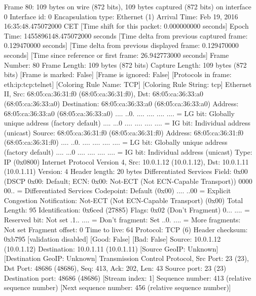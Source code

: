 Frame 80: 109 bytes on wire (872 bits), 109 bytes captured (872 bits) on interface 0
    Interface id: 0
    Encapsulation type: Ethernet (1)
    Arrival Time: Feb 19, 2016 16:35:48.475072000 CET
    [Time shift for this packet: 0.000000000 seconds]
    Epoch Time: 1455896148.475072000 seconds
    [Time delta from previous captured frame: 0.129470000 seconds]
    [Time delta from previous displayed frame: 0.129470000 seconds]
    [Time since reference or first frame: 26.942773000 seconds]
    Frame Number: 80
    Frame Length: 109 bytes (872 bits)
    Capture Length: 109 bytes (872 bits)
    [Frame is marked: False]
    [Frame is ignored: False]
    [Protocols in frame: eth:ip:tcp:telnet]
    [Coloring Rule Name: TCP]
    [Coloring Rule String: tcp]
Ethernet II, Src: 68:05:ca:36:31:f0 (68:05:ca:36:31:f0), Dst: 68:05:ca:36:33:a0 (68:05:ca:36:33:a0)
    Destination: 68:05:ca:36:33:a0 (68:05:ca:36:33:a0)
        Address: 68:05:ca:36:33:a0 (68:05:ca:36:33:a0)
        .... ..0. .... .... .... .... = LG bit: Globally unique address (factory default)
        .... ...0 .... .... .... .... = IG bit: Individual address (unicast)
    Source: 68:05:ca:36:31:f0 (68:05:ca:36:31:f0)
        Address: 68:05:ca:36:31:f0 (68:05:ca:36:31:f0)
        .... ..0. .... .... .... .... = LG bit: Globally unique address (factory default)
        .... ...0 .... .... .... .... = IG bit: Individual address (unicast)
    Type: IP (0x0800)
Internet Protocol Version 4, Src: 10.0.1.12 (10.0.1.12), Dst: 10.0.1.11 (10.0.1.11)
    Version: 4
    Header length: 20 bytes
    Differentiated Services Field: 0x00 (DSCP 0x00: Default; ECN: 0x00: Not-ECT (Not ECN-Capable Transport))
        0000 00.. = Differentiated Services Codepoint: Default (0x00)
        .... ..00 = Explicit Congestion Notification: Not-ECT (Not ECN-Capable Transport) (0x00)
    Total Length: 95
    Identification: 0x6ced (27885)
    Flags: 0x02 (Don't Fragment)
        0... .... = Reserved bit: Not set
        .1.. .... = Don't fragment: Set
        ..0. .... = More fragments: Not set
    Fragment offset: 0
    Time to live: 64
    Protocol: TCP (6)
    Header checksum: 0xb795 [validation disabled]
        [Good: False]
        [Bad: False]
    Source: 10.0.1.12 (10.0.1.12)
    Destination: 10.0.1.11 (10.0.1.11)
    [Source GeoIP: Unknown]
    [Destination GeoIP: Unknown]
Transmission Control Protocol, Src Port: 23 (23), Dst Port: 48686 (48686), Seq: 413, Ack: 202, Len: 43
    Source port: 23 (23)
    Destination port: 48686 (48686)
    [Stream index: 1]
    Sequence number: 413    (relative sequence number)
    [Next sequence number: 456    (relative sequence number)]
